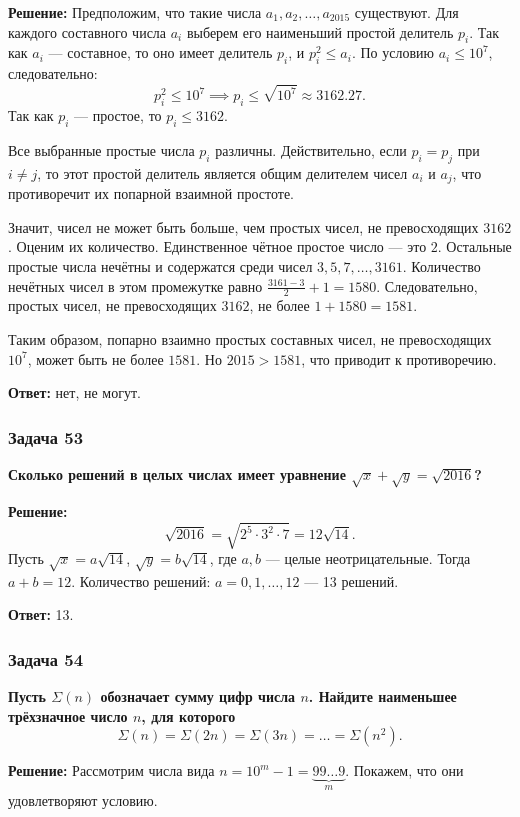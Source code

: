 \documentclass[12pt, a4paper]{article}
\begin{document}
\textbf{Решение:}
Предположим, что такие числа \(a_1, a_2, \dots, a_{2015}\) существуют.
Для каждого составного числа \(a_i\) выберем его наименьший простой делитель \(p_i\).
Так как \(a_i\) — составное, то оно имеет делитель \(p_i\), и \(p_i^2 \le a_i\). 
По условию \(a_i \le 10^7\), следовательно:
\[
p_i^2 \le 10^7 \implies p_i \le \sqrt{10^7} \approx 3162.27.
\]
Так как \(p_i\) — простое, то \(p_i \le 3162\).

Все выбранные простые числа \(p_i\) различны. Действительно, если \(p_i = p_j\) при \(i \neq j\), то этот простой делитель является общим делителем чисел \(a_i\) и \(a_j\), что противоречит их попарной взаимной простоте.

Значит, чисел не может быть больше, чем простых чисел, не превосходящих \(3162\). Оценим их количество. 
Единственное чётное простое число — это \(2\). Остальные простые числа нечётны и содержатся среди чисел \(3, 5, 7, \dots, 3161\). Количество нечётных чисел в этом промежутке равно \(\frac{3161 - 3}{2} + 1 = 1580\). 
Следовательно, простых чисел, не превосходящих \(3162\), не более \(1 + 1580 = 1581\).

Таким образом, попарно взаимно простых составных чисел, не превосходящих \(10^7\), может быть не более \(1581\). 
Но \(2015 > 1581\), что приводит к противоречию.

\textbf{Ответ:} нет, не могут.

\subsubsection*{Задача 53}
\textbf{Сколько решений в целых числах имеет уравнение $\sqrt{x} + \sqrt{y} = \sqrt{2016}$?}

\textbf{Решение:}
\[
\sqrt{2016} = \sqrt{2^5 \cdot 3^2 \cdot 7} = 12\sqrt{14}.
\]
Пусть $\sqrt{x} = a\sqrt{14}$, $\sqrt{y} = b\sqrt{14}$, где $a, b$ — целые неотрицательные. Тогда $a + b = 12$. Количество решений: $a = 0, 1, \ldots, 12$ — 13 решений.

\textbf{Ответ:} 13.

\subsubsection*{Задача 54}
\textbf{Пусть $\Sigma(n)$ обозначает сумму цифр числа $n$. Найдите наименьшее трёхзначное число $n$, для которого}
\[
\Sigma(n) = \Sigma(2n) = \Sigma(3n) = \ldots = \Sigma(n^2).
\]

\textbf{Решение:}
Рассмотрим числа вида $n = 10^m - 1 = \underbrace{99\ldots9}_{m}$. Покажем, что они удовлетворяют условию.
\end{document}
